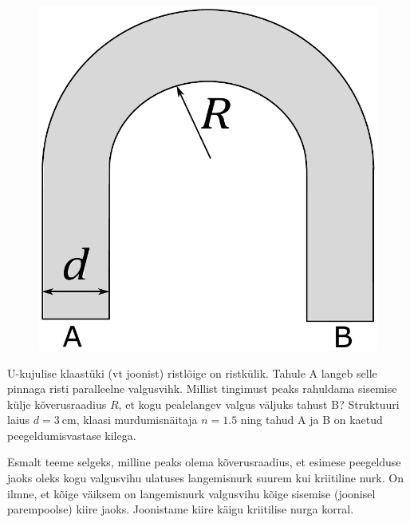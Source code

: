 
\begin{figure}
		\vspace{-10pt}
		\includegraphics[width=\linewidth]{2020-lahg-03-yl.pdf}
	\end{figure}
	U-kujulise klaastüki (vt joonist) ristlõige on ristkülik. Tahule A langeb selle pinnaga risti paralleelne valgusvihk.  Millist tingimust peaks rahuldama sisemise külje kõverusraadius $R$, et kogu pealelangev valgus väljuks tahust B? Struktuuri laius $d=\SI{3}{\cm}$, klaasi murdumisnäitaja $n=\num{1.5}$ ning tahud A ja B on kaetud peegeldumisvastase kilega.
	
	
	
\hint

\solu
Esmalt teeme selgeks, milline peaks olema kõverusraadius, et esimese peegelduse jaoks oleks kogu valgusvihu ulatuses langemisnurk suurem kui kriitiline nurk. On ilmne, et kõige väiksem on langemisnurk valgusvihu kõige sisemise (joonisel parempoolse) kiire jaoks. Joonistame kiire käigu kriitilise nurga korral.

